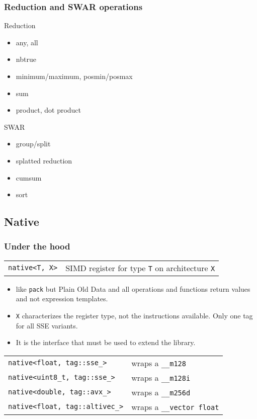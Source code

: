 \documentclass{beamer}
\begin{document}
\begin{frame}
	\frametitle{Reduction and SWAR operations}
	
	\begin{multicols}{2}	
	
	Reduction
	\begin{itemize}
		\item any, all
		\item nbtrue
		\item minimum/maximum, posmin/posmax
		\item sum
		\item product, dot product
	\end{itemize}
	\columnbreak	
	
	SWAR
	\begin{itemize}
		\item group/split
		\item splatted reduction
		\item cumsum
		\item sort
	\end{itemize}
	
	\vfill
	\end{multicols}
	
\end{frame}

\subsection{Native}
\begin{frame}
	\frametitle{Under the hood}
	
	\begin{tabular}{ll}
	\lstinline{native<T, X>} & SIMD register for type \lstinline{T} on architecture \lstinline{X}
	\end{tabular}
	\bigskip
	
	\begin{itemize}
		\item like \lstinline{pack} but Plain Old Data and all operations and functions return values and not
		      expression templates.
		\item \lstinline{X} characterizes the register type, not the instructions available. Only one tag for all
		      SSE variants.
		\item It is the interface that must be used to extend the library.
	\end{itemize}
	\bigskip
	
	\begin{tabular}{ll}
	\lstinline{native<float, tag::sse_>} & wraps a \lstinline{__m128}\\
	\lstinline{native<uint8_t, tag::sse_>} & wraps a \lstinline{__m128i}\\
	\lstinline{native<double, tag::avx_>} & wraps a \lstinline{__m256d}\\
	\lstinline{native<float, tag::altivec_>} & wraps a \lstinline{__vector float}
	\end{tabular}
	
\end{frame}
\end{document}
